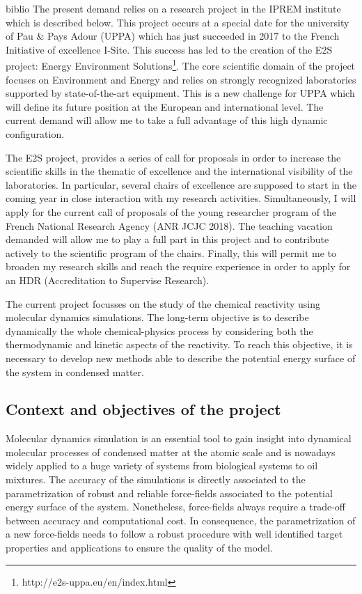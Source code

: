 \documentclass[11pt]{artuppax}
\newcounter{subsec}[section]
\begin{document}
\begin{btSect}{biblio}
The present demand relies on a research project in the IPREM institute which is described below. This project occurs at a special date for the university of Pau \& Pays Adour (UPPA) which has just succeeded in 2017 to the French Initiative of excellence I-Site. This success has led to the creation of the E2S project: Energy Environment Solutions\footnote{http://e2s-uppa.eu/en/index.html}. The core scientific domain of the project focuses on Environment and Energy and relies on strongly recognized laboratories supported by state-of-the-art equipment. This is a new challenge for UPPA which will define its future position at the European and international level. The current demand will allow me to take a full advantage of this high dynamic configuration.

The E2S project, provides a series of call for proposals in order to increase the scientific skills in the thematic of excellence and the international visibility of the laboratories. In particular, several chairs of excellence are supposed to start in the coming year in close interaction with my research activities. Simultaneously, I will apply for the current call of proposals of the young researcher program of the French National Research Agency (ANR JCJC 2018). The teaching vacation demanded will allow me to play a full part in this project and to contribute actively to the scientific program of the chairs. Finally, this will permit me to broaden my research skills and reach the require experience in order to apply for an HDR (Accreditation to Supervise Research).

The current project focusses on the study of the chemical reactivity using molecular dynamics simulations. The long-term objective is to describe dynamically the whole chemical-physics process by considering both the thermodynamic and kinetic aspects of the reactivity. To reach this objective, it is necessary to develop new methods able to describe the potential energy surface of the system in condensed matter.

\subsection{Context and objectives of the project}

Molecular dynamics simulation is an essential tool to gain insight into dynamical molecular processes of condensed matter at the atomic scale and is nowadays widely applied to a huge variety of systems from biological systems to oil mixtures. The accuracy of the simulations is directly associated to the parametrization of robust and reliable force-fields associated to the potential energy surface of the system.  Nonetheless, force-fields always require a trade-off between accuracy and computational cost. In consequence, the parametrization of a new force-fields needs to follow a robust procedure with well identified target properties and applications to ensure the quality of the model.


\end{btSect}
\end{document}
